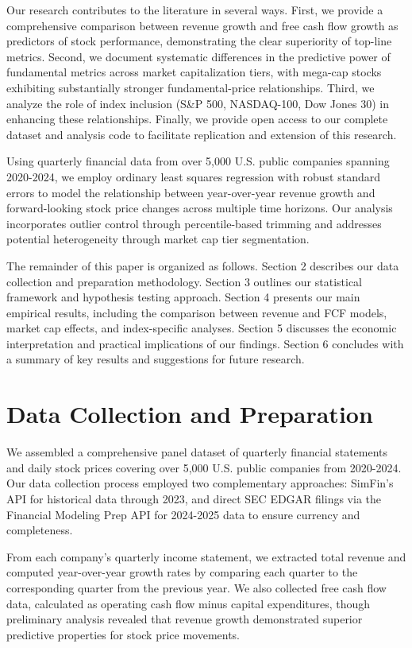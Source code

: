\documentclass[11pt]{article}
\begin{document}
Our research contributes to the literature in several ways. First, we provide a comprehensive comparison between revenue growth and free cash flow growth as predictors of stock performance, demonstrating the clear superiority of top-line metrics. Second, we document systematic differences in the predictive power of fundamental metrics across market capitalization tiers, with mega-cap stocks exhibiting substantially stronger fundamental-price relationships. Third, we analyze the role of index inclusion (S\&P 500, NASDAQ-100, Dow Jones 30) in enhancing these relationships. Finally, we provide open access to our complete dataset and analysis code to facilitate replication and extension of this research.

Using quarterly financial data from over 5,000 U.S. public companies spanning 2020-2024, we employ ordinary least squares regression with robust standard errors to model the relationship between year-over-year revenue growth and forward-looking stock price changes across multiple time horizons. Our analysis incorporates outlier control through percentile-based trimming and addresses potential heterogeneity through market cap tier segmentation.

The remainder of this paper is organized as follows. Section 2 describes our data collection and preparation methodology. Section 3 outlines our statistical framework and hypothesis testing approach. Section 4 presents our main empirical results, including the comparison between revenue and FCF models, market cap effects, and index-specific analyses. Section 5 discusses the economic interpretation and practical implications of our findings. Section 6 concludes with a summary of key results and suggestions for future research.

\section{Data Collection and Preparation}

We assembled a comprehensive panel dataset of quarterly financial statements and daily stock prices covering over 5,000 U.S. public companies from 2020-2024. Our data collection process employed two complementary approaches: SimFin's API \citep{simfin} for historical data through 2023, and direct SEC EDGAR filings via the Financial Modeling Prep API for 2024-2025 data to ensure currency and completeness.

From each company's quarterly income statement, we extracted total revenue and computed year-over-year growth rates by comparing each quarter to the corresponding quarter from the previous year. We also collected free cash flow data, calculated as operating cash flow minus capital expenditures, though preliminary analysis revealed that revenue growth demonstrated superior predictive properties for stock price movements.
\end{document}
